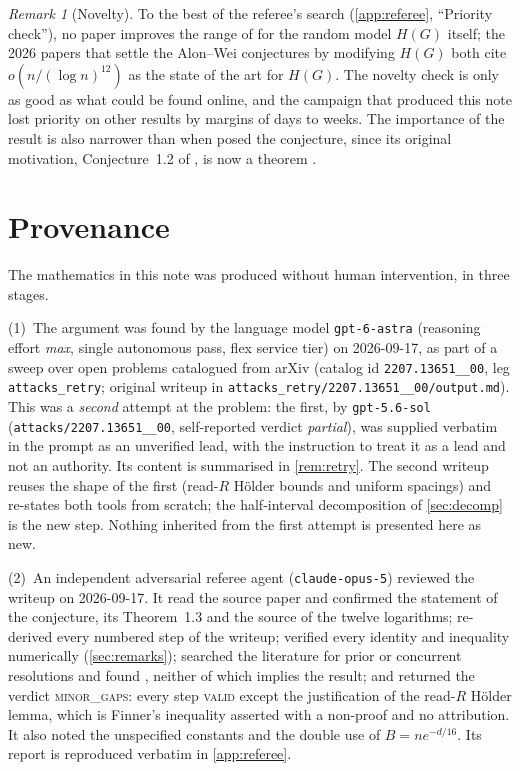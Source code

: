 \documentclass[11pt,a4paper]{article}
\theoremstyle{plain}
\theoremstyle{definition}
\theoremstyle{remark}
\newtheorem{remark}[theorem]{Remark}
\begin{document}
\begin{remark}[Novelty]
To the best of the referee's search (\cref{app:referee}, ``Priority check''), no paper improves the range of \cite[Theorem~1.3]{FLP24} for the random model $H(G)$ itself; the 2026 papers \cite{MPS26,CTW26} that settle the Alon--Wei conjectures by modifying $H(G)$ both cite $o(n/(\log n)^{12})$ as the state of the art for $H(G)$. The novelty check is only as good as what could be found online, and the campaign that produced this note lost priority on other results by margins of days to weeks. The importance of the result is also narrower than when \cite{FLP24} posed the conjecture, since its original motivation, Conjecture~1.2 of \cite{FLP24}, is now a theorem \cite{MPS26}.
\end{remark}

\section{Provenance}\label{sec:provenance}

The mathematics in this note was produced without human intervention, in three stages.

(1)~The argument was found by the language model \texttt{gpt-6-astra} (reasoning effort \emph{max}, single autonomous pass, flex service tier) on 2026-09-17, as part of a sweep over open problems catalogued from arXiv (catalog id \texttt{2207.13651\_\_00}, leg \texttt{attacks\_retry}; original writeup in \nolinkurl{attacks_retry/2207.13651__00/output.md}). This was a \emph{second} attempt at the problem: the first, by \texttt{gpt-5.6-sol} (\texttt{attacks/2207.13651\_\_00}, self-reported verdict \emph{partial}), was supplied verbatim in the prompt as an unverified lead, with the instruction to treat it as a lead and not an authority. Its content is summarised in \cref{rem:retry}. The second writeup reuses the shape of the first (read-$R$ H\"older bounds and uniform spacings) and re-states both tools from scratch; the half-interval decomposition of \cref{sec:decomp} is the new step. Nothing inherited from the first attempt is presented here as new.

(2)~An independent adversarial referee agent (\texttt{claude-opus-5}) reviewed the writeup on 2026-09-17. It read the source paper \cite{FLP24} and confirmed the statement of the conjecture, its Theorem~1.3 and the source of the twelve logarithms; re-derived every numbered step of the writeup; verified every identity and inequality numerically (\cref{sec:remarks}); searched the literature for prior or concurrent resolutions and found \cite{MPS26,CTW26}, neither of which implies the result; and returned the verdict \textsc{minor\_gaps}: every step \textsc{valid} except the justification of the read-$R$ H\"older lemma, which is Finner's inequality asserted with a non-proof and no attribution. It also noted the unspecified constants and the double use of $B=ne^{-d/16}$. Its report is reproduced verbatim in \cref{app:referee}.
\end{document}
